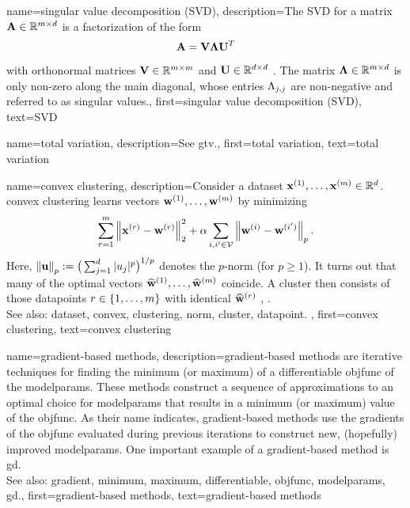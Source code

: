 {name={singular value decomposition (SVD)}, 
  	description={The SVD  
  		for a matrix ${\bf A} \in \mathbb{R}^{m \times d}$ 
		is a factorization of the form 
		$${\bf A} = \mathbf{V} {\bm \Lambda} \mathbf{U}^{T}$$ 
		with orthonormal matrices $\mathbf{V} \in \mathbb{R}^{m \times m}$ 
		and $\mathbf{U} \in \mathbb{R}^{d \times d}$ \cite{GolubVanLoanBook}. 
		The matrix ${\bm \Lambda} \in \mathbb{R}^{m \times d}$ is 
		only non-zero along the main diagonal, whose entries $\Lambda_{j,j}$ 
		are non-negative and referred to as singular values.},
	first={singular value decomposition (SVD)},
	text={SVD} 
}


{name={total variation}, 
	description={See \gls{gtv}.},
	first={total variation},
	text={total variation} 
}


 {name={convex clustering}, 
 	description={Consider a \gls{dataset} 
 		${\bf x}^{(1)}, \ldots, {\bf x}^{(m)} \in \mathbb{R}^{d}$. 
 		\Gls{convex} \gls{clustering} learns vectors ${\bf w}^{(1)}, \ldots, {\bf w}^{(m)}$ by minimizing 
 		$$\sum_{r=1}^{m} \left\Vert {{\bf x}^{(r)} - {\bf w}^{(r)}} \right\Vert_{2}^2 + 
 		\alpha \sum_{i,i' \in \mathcal{V}} \left\Vert {{\bf w}^{(i)} - {\bf w}^{(i')}} \right\Vert_{p}.$$ 
		Here, $\left\Vert {{\bf u}} \right\Vert_{p} := \big( \sum_{j=1}^{d} |u_{j}|^{p} \big)^{1/p}$ 
		denotes the $p$-\gls{norm} (for $p\geq1$).  
		It turns out that many of the optimal vectors $\widehat{{\bf w}}^{(1)}, \ldots, \widehat{{\bf w}}^{(m)}$ 
		coincide. A \gls{cluster} then consists of those \glspl{datapoint} $r \in \{1, \ldots, m\}$ 
		with identical $\widehat{{\bf w}}^{(r)}$ \cite{JMLR:v22:18-694}, \cite{Pelckmans2005}. 
			\\
		See also: \gls{dataset}, \gls{convex}, \gls{clustering}, \gls{norm}, \gls{cluster}, \gls{datapoint}. },
 	first={convex clustering},
	text={convex clustering} 
}


{name={gradient-based methods}, 
	description={\Gls{gradient}-based 
		methods are iterative techniques for finding the \gls{minimum} (or \gls{maximum}) 
		of a \gls{differentiable} \gls{objfunc} of the \gls{modelparams}. These 
		methods construct a sequence of approximations to an optimal choice for 
		\gls{modelparams} that results in a \gls{minimum} (or \gls{maximum}) value of the \gls{objfunc}. 
		As their name indicates, \gls{gradient}-based methods use the \glspl{gradient} of the \gls{objfunc} 
		evaluated during previous iterations to construct new, (hopefully) improved \gls{modelparams}. 
		One important example of a \gls{gradient}-based method is \gls{gd}.
				\\
		See also: \gls{gradient}, \gls{minimum}, \gls{maximum}, \gls{differentiable}, \gls{objfunc}, \gls{modelparams}, \gls{gd}.},
	first={gradient-based methods},
	text={gradient-based methods} 
}


